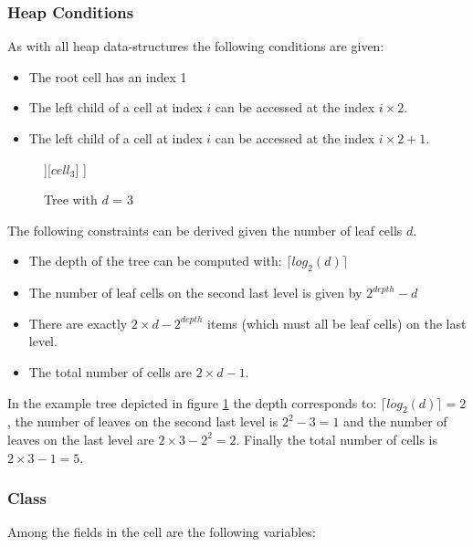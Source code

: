 \documentclass[]{article}
\begin{document}
\subsubsection{Heap Conditions}
As with all heap data-structures the following conditions are given:

\begin{itemize}
	\item The root cell has an index 1
	\item The left child of a cell at index $i$ can be accessed at the index $i\times2$. 
	\item The left child of a cell at index $i$ can be accessed at the index $i\times2 + 1$. 
\end{itemize}

\begin{figure}[H]
	\centering
	\begin{forest}
		[$cell_1$
		[$cell_2$ [$cell_4$] [$cell_5$]][$cell_3$]  
		]
	\end{forest}
	\caption{Tree with $d$ = 3}
	\label{fig:extree}
\end{figure}

\vspace{0.5cm}
The following constraints can be derived given the number of leaf cells $d$. 

\begin{itemize}
	\item The depth of the tree can be computed with: $\lceil log_2(d) \rceil$
	\item The number of leaf cells on the second last level is given by $2^{depth} - d$ 
	\item There are exactly $2 \times d - 2^{depth}$ items (which must all be leaf cells) on the last level. 
	\item The total number of cells are $2\times d - 1$.
\end{itemize}

In the example tree depicted in figure \ref{fig:extree} the depth corresponds to: $\lceil log_2(d) \rceil = 2$, the number of leaves on the second last level is  $2^{2} - 3 = 1$ and the number of leaves on the last level are $2 \times 3 - 2^{2} = 2$. Finally the total number of cells is $2\times 3 - 1 = 5$.

\subsubsection{Class}
Among the fields in the cell are the following variables:
\end{document}
